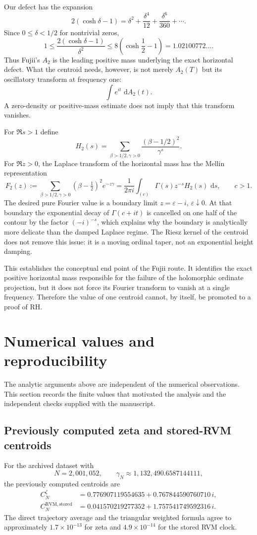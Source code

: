 \documentclass[11pt]{article}
\theoremstyle{definition}
\theoremstyle{remark}
\newcommand{\dd}{\,\mathrm d}
\begin{document}
Our defect has the expansion
\[
2(\cosh\delta-1)
=\delta^2+\frac{\delta^4}{12}+\frac{\delta^6}{360}+\cdots.
\]
Since $0\le\delta<1/2$ for nontrivial zeros,
\[
1\le
\frac{2(\cosh\delta-1)}{\delta^2}
\le 8\left(\cosh\frac12-1\right)
=1.02100772\ldots.
\]
Thus Fujii's $A_2$ is the leading positive mass underlying the exact horizontal defect.  What the centroid needs, however, is not merely $A_2(T)$ but its oscillatory transform at frequency one:
\[
\int e^{it}\,\dd A_2(t).
\]
A zero-density or positive-mass estimate does not imply that this transform vanishes.

For $\Re s>1$ define
\[
H_2(s)=\sum_{\beta>1/2,\gamma>0}
\frac{(\beta-1/2)^2}{\gamma^s}.
\]
For $\Re z>0$, the Laplace transform of the horizontal mass has the Mellin representation
\begin{equation}\label{eq:MellinFujii}
F_2(z)
:=\sum_{\beta>1/2,\gamma>0}(\beta-\tfrac12)^2e^{-z\gamma}
=\frac1{2\pi i}\int_{(c)}\Gamma(s)z^{-s}H_2(s)\,\dd s,
\qquad c>1.
\end{equation}
The desired pure Fourier value is a boundary limit $z=\varepsilon-i$, $\varepsilon\downarrow0$.  At that boundary the exponential decay of $\Gamma(c+it)$ is cancelled on one half of the contour by the factor $(-i)^{-s}$, which explains why the boundary is analytically more delicate than the damped Laplace regime.  The Riesz kernel of the centroid does not remove this issue: it is a moving ordinal taper, not an exponential height damping.

This establishes the conceptual end point of the Fujii route.  It identifies the exact positive horizontal mass responsible for the failure of the holomorphic ordinate projection, but it does not force its Fourier transform to vanish at a single frequency.  Therefore the value of one centroid cannot, by itself, be promoted to a proof of RH.

\section{Numerical values and reproducibility}\label{sec:numerics}

The analytic arguments above are independent of the numerical observations.  This section records the finite values that motivated the analysis and the independent checks supplied with the manuscript.

\subsection{Previously computed zeta and stored-RVM centroids}
For the archived dataset with
\[
N=2{,}001{,}052,
\qquad
\gamma_N\approx1{,}132{,}490.6587144111,
\]
the previously computed centroids are
\begin{align*}
C_N^{\zeta}
&=0.776907119554635+0.767844590760710\,i,\\
C_N^{\mathrm{RVM,stored}}
&=0.041570219277352+1.757541749592316\,i.
\end{align*}
The direct trajectory average and the triangular weighted formula agree to approximately $1.7\times10^{-13}$ for zeta and $4.9\times10^{-14}$ for the stored RVM clock.
\end{document}
